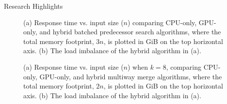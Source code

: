 \documentclass[final]{beamer}
\newlength{\colwidth}
\begin{document}
\begin{frame}[t]
\begin{columns}[t]
\begin{column}{\colwidth}
\begin{block}{Research Highlights}
 \begin{figure}[htp]
\centering
{}
    \caption{(a) Response time vs. input size ($n$) comparing CPU-only, GPU-only, and hybrid batched predecessor search algorithms, where the total memory footprint, $3n$, is plotted in GiB on the top horizontal axis. (b) The load imbalance of the hybrid algorithm in (a).}
   \label{fig:predecessor_search_results}
\end{figure}
 


\begin{figure}[htp]
\centering
{}
    \caption{(a) Response time vs. input size ($n$) when $k=8$, comparing CPU-only, GPU-only, and hybrid multiway merge algorithms, where the total memory footprint, $2n$, is plotted in GiB on the top horizontal axis. (b) The load imbalance of the hybrid algorithm in (a).}
   \label{fig:multiway_merge_results}
\end{figure}


\end{block}
\end{column}
\end{columns}
\end{frame}
\end{document}
